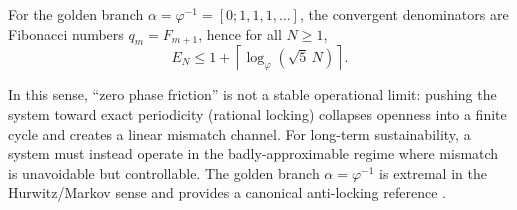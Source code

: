 \begin{corollary}
\label{cor:golden_EN}
For the golden branch $\alpha=\varphi^{-1}=[0;1,1,1,\dots]$, the convergent denominators are Fibonacci numbers $q_m=F_{m+1}$, hence for all $N\ge 1$,
\begin{equation}
  E_N \le 1 + \left\lceil \log_{\varphi}\!\left(\sqrt{5}\,N\right)\right\rceil.
  \label{eq:EN_golden_explicit}
\end{equation}
\end{corollary}

In this sense, ``zero phase friction'' is not a stable operational limit: pushing the system toward exact periodicity (rational locking) collapses openness into a finite cycle and creates a linear mismatch channel.
For long-term sustainability, a system must instead operate in the badly-approximable regime where mismatch is unavoidable but controllable.
The golden branch $\alpha=\varphi^{-1}$ is extremal in the Hurwitz/Markov sense and provides a canonical anti-locking reference \cite{Cassels1957}.


